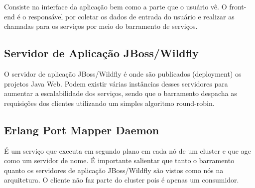 Consiste na interface da aplicação bem como a parte que o usuário vê. O front-end é o responsável por coletar os dados de entrada do usuário
e realizar as chamadas para os serviços por meio do barramento de serviços.

\subsection{Servidor de Aplicação JBoss/Wildfly}

O servidor de aplicação JBoss/Wildfly é onde são publicados (deployment)
os projetos Java Web. Podem existir várias instâncias desses servidores para
aumentar a escalabilidade dos serviços, sendo que o barramento despacha
as requisições dos clientes utilizando um simples algoritmo round-robin.

\subsection{Erlang Port Mapper Daemon}

É um serviço que executa em 
segundo plano em cada nó de um cluster e que age como um servidor de nome.
É importante salientar que tanto o barramento quanto os
servidores de aplicação JBoss/Wildfly são vistos como nós 
na arquitetura. O cliente não faz parte do cluster pois é apenas um consumidor.

